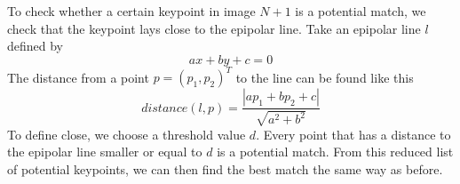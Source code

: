 To check whether a certain keypoint in image $N+1$ is a potential match, we check that the keypoint lays close to the epipolar line. Take an epipolar line $l$ defined by
\begin{equation}
    ax + by + c = 0
\end{equation}
 The distance from a point $p = (p_1, p_2)^T$ to the line can be found like this
\begin{equation}
    distance(l, p) = \frac{|ap_1+bp_2+c|}{\sqrt{a^2+b^2}}
\end{equation}
To define close, we choose a threshold value $d$. Every point that has a distance to the epipolar line smaller or equal to $d$ is a potential match. From this reduced list of potential keypoints, we can then find the best match the same way as before.
